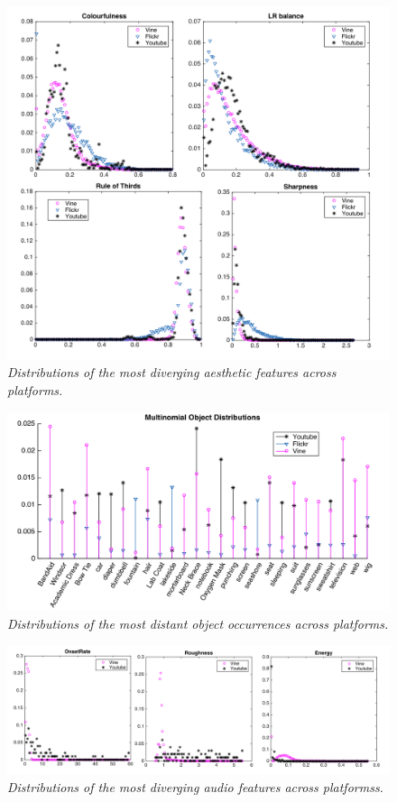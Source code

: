 \begin{figure}[!htb]
\centering
\includegraphics[width=\columnwidth]{plots/comparison/aesthetics}
\caption{\textsl{ Distributions of the most diverging aesthetic features across platforms.}}
\label{fig:comparison_aesthetics}
\end{figure}

\begin{figure}[!htb]
\centering
\includegraphics[width=\columnwidth]{plots/comparison/objects}
\caption{\textsl{ Distributions of the most distant object occurrences across platforms.}}
\label{fig:comparison_objects}
\end{figure}

\begin{figure}[!htb]
\centering
\includegraphics[width=\columnwidth]{plots/comparison/audio}
\caption{\textsl{ Distributions of the most diverging audio features across platformss.}}
\label{fig:comparison_audio}
\end{figure}
